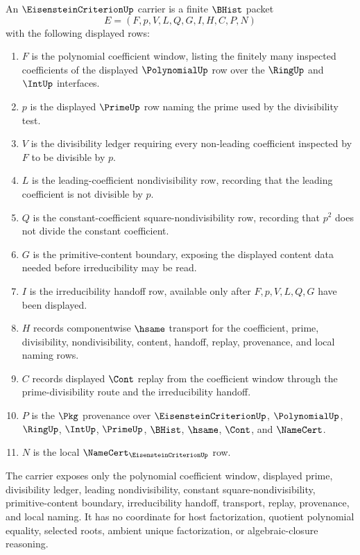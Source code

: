 \begin{definition}
\label{def:eisenstein-criterion-carrier}
An $\EisensteinCriterionUp$ carrier is a finite $\BHist$ packet
$$
E=(F,p,V,L,Q,G,I,H,C,P,N)
$$
with the following displayed rows:
\begin{enumerate}
\item $F$ is the polynomial coefficient window, listing the finitely many inspected coefficients of the displayed $\PolynomialUp$ row over the $\RingUp$ and $\IntUp$ interfaces.
\item $p$ is the displayed $\PrimeUp$ row naming the prime used by the divisibility test.
\item $V$ is the divisibility ledger requiring every non-leading coefficient inspected by $F$ to be divisible by $p$.
\item $L$ is the leading-coefficient nondivisibility row, recording that the leading coefficient is not divisible by $p$.
\item $Q$ is the constant-coefficient square-nondivisibility row, recording that $p^2$ does not divide the constant coefficient.
\item $G$ is the primitive-content boundary, exposing the displayed content data needed before irreducibility may be read.
\item $I$ is the irreducibility handoff row, available only after $F,p,V,L,Q,G$ have been displayed.
\item $H$ records componentwise $\hsame$ transport for the coefficient, prime, divisibility, nondivisibility, content, handoff, replay, provenance, and local naming rows.
\item $C$ records displayed $\Cont$ replay from the coefficient window through the prime-divisibility route and the irreducibility handoff.
\item $P$ is the $\Pkg$ provenance over $\EisensteinCriterionUp$, $\PolynomialUp$, $\RingUp$, $\IntUp$, $\PrimeUp$, $\BHist$, $\hsame$, $\Cont$, and $\NameCert$.
\item $N$ is the local $\NameCert_{\EisensteinCriterionUp}$ row.
\end{enumerate}
The carrier exposes only the polynomial coefficient window, displayed prime, divisibility ledger, leading nondivisibility, constant square-nondivisibility, primitive-content boundary, irreducibility handoff, transport, replay, provenance, and local naming. It has no coordinate for host factorization, quotient polynomial equality, selected roots, ambient unique factorization, or algebraic-closure reasoning.
\end{definition}

